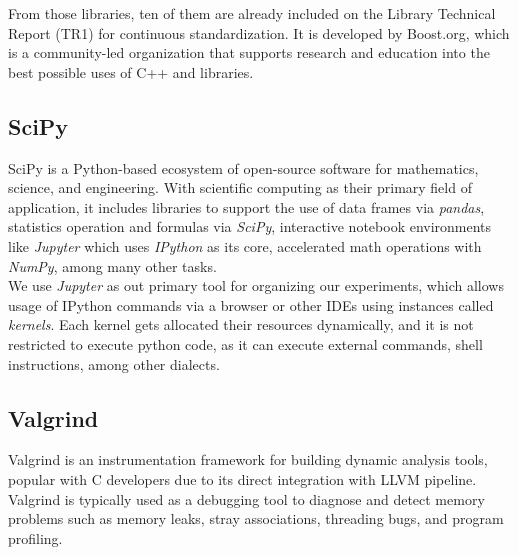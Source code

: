 From those libraries, ten of them are already included on the Library Technical Report (TR1) for continuous standardization. It is developed by Boost.org, which is a community-led organization that supports research and education into the best possible uses of C++ and libraries.\\

\subsection{SciPy}

SciPy is a Python-based ecosystem of open-source software for mathematics, science, and engineering. With scientific computing as their primary field of application, it includes libraries to support the use of data frames via \textit{pandas}, statistics operation and formulas via \textit{SciPy}, interactive notebook environments like \textit{Jupyter} which uses \textit{IPython} as its core, accelerated math operations with \textit{NumPy}, among many other tasks. \\

We use \textit{Jupyter} as out primary tool for organizing our experiments, which allows usage of IPython commands via a browser or other IDEs using instances called \textit{kernels}. Each kernel gets allocated their resources dynamically, and it is not restricted to execute python code, as it can execute external commands, shell instructions, among other dialects. \\

\subsection{Valgrind}

Valgrind is an instrumentation framework for building dynamic analysis tools, popular with C developers due to its direct integration with LLVM pipeline. Valgrind is typically used as a debugging tool to diagnose and detect memory problems such as memory leaks, stray associations, threading bugs, and program profiling.\\